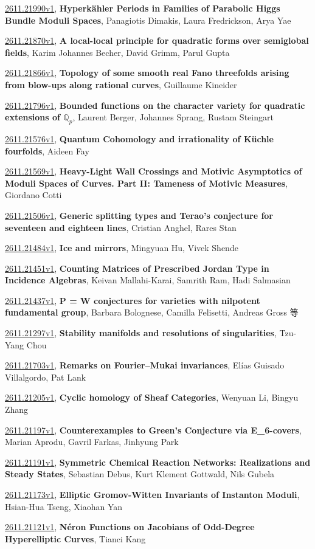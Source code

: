 \documentclass[9pt, a4paper]{article}
\theoremstyle{plain}
\theoremstyle{definition}
\theoremstyle{remark}
\newcommand{\arxiv}[3]{\href{https://arxiv.org/abs/#1}{#1}, \textbf{\textcolor{arxivblue}{#2}}, #3}
\begin{document}
\arxiv{2611.21990v1}{Hyperkähler Periods in Families of Parabolic Higgs Bundle Moduli Spaces}{Panagiotis Dimakis, Laura Fredrickson, Arya Yae}

\arxiv{2611.21870v1}{A local-local principle for quadratic forms over semiglobal fields}{Karim Johannes Becher, David Grimm, Parul Gupta}

\arxiv{2611.21866v1}{Topology of some smooth real Fano threefolds arising from blow-ups along rational curves}{Guillaume Kineider}

\arxiv{2611.21796v1}{Bounded functions on the character variety for quadratic extensions of $\mathbb{Q}_p$}{Laurent Berger, Johannes Sprang, Rustam Steingart}

\arxiv{2611.21576v1}{Quantum Cohomology and irrationality of Küchle fourfolds}{Aideen Fay}

\arxiv{2611.21569v1}{Heavy-Light Wall Crossings and Motivic Asymptotics of Moduli Spaces of Curves. Part II: Tameness of Motivic Measures}{Giordano Cotti}

\arxiv{2611.21506v1}{Generic splitting types and Terao's conjecture for seventeen and eighteen lines}{Cristian Anghel, Rares Stan}

\arxiv{2611.21484v1}{Ice and mirrors}{Mingyuan Hu, Vivek Shende}

\arxiv{2611.21451v1}{Counting Matrices of Prescribed Jordan Type in Incidence Algebras}{Keivan Mallahi-Karai, Samrith Ram, Hadi Salmasian}

\arxiv{2611.21437v1}{P = W conjectures for varieties with nilpotent fundamental group}{Barbara Bolognese, Camilla Felisetti, Andreas Gross 等}

\arxiv{2611.21297v1}{Stability manifolds and resolutions of singularities}{Tzu-Yang Chou}

\arxiv{2611.21703v1}{Remarks on Fourier--Mukai invariances}{Elías Guisado Villalgordo, Pat Lank}

\arxiv{2611.21205v1}{Cyclic homology of Sheaf Categories}{Wenyuan Li, Bingyu Zhang}

\arxiv{2611.21197v1}{Counterexamples to Green's Conjecture via E_6-covers}{Marian Aprodu, Gavril Farkas, Jinhyung Park}

\arxiv{2611.21191v1}{Symmetric Chemical Reaction Networks: Realizations and Steady States}{Sebastian Debus, Kurt Klement Gottwald, Nils Gubela}

\arxiv{2611.21173v1}{Elliptic Gromov-Witten Invariants of Instanton Moduli}{Hsian-Hua Tseng, Xiaohan Yan}

\arxiv{2611.21121v1}{Néron Functions on Jacobians of Odd-Degree Hyperelliptic Curves}{Tianci Kang}
\end{document}
